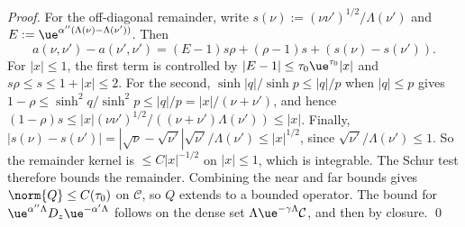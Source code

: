 \begin{proof}
For the off-diagonal remainder, write $s(\nu):=(\nu\nu')^{1/2}/\Lambda(\nu')$ and
$E:=\ue^{\alpha''(\Lambda(\nu)-\Lambda(\nu'))}$. Then
\[
a(\nu,\nu')-a(\nu',\nu')=(E-1)s\rho+(\rho-1)s+(s(\nu)-s(\nu')).
\]
For $|x|\le1$, the first term is controlled by $|E-1|\le\tau_0\ue^{\tau_0}|x|$ and
$s\rho\le s\le1+|x|\le2$. For the second, $\sinh|q|/\sinh p\le|q|/p$ when $|q|\le p$ gives
$1-\rho\le\sinh^2q/\sinh^2p\le|q|/p=|x|/(\nu+\nu')$, and hence
$(1-\rho)s\le|x|(\nu\nu')^{1/2}/((\nu+\nu')\Lambda(\nu'))\le|x|$.
Finally, $|s(\nu)-s(\nu')|=|\sqrt\nu-\sqrt{\nu'}|\sqrt{\nu'}/\Lambda(\nu')\le|x|^{1/2}$,
since $\sqrt{\nu'}/\Lambda(\nu')\le1$.
So the remainder kernel is $\le C|x|^{-1/2}$ on $|x|\le1$, which is integrable. The Schur test therefore bounds the remainder.
Combining the near and far bounds gives $\norm{Q}\le C(\tau_0)$ on $\mathcal C$, so $Q$ extends to a bounded operator. The bound for $\ue^{\alpha''\Lambda}D_z\ue^{-\alpha'\Lambda}$ follows on the dense set $\Lambda\ue^{-\gamma\Lambda}\mathcal C$, and then by closure. \qed
\end{proof}

